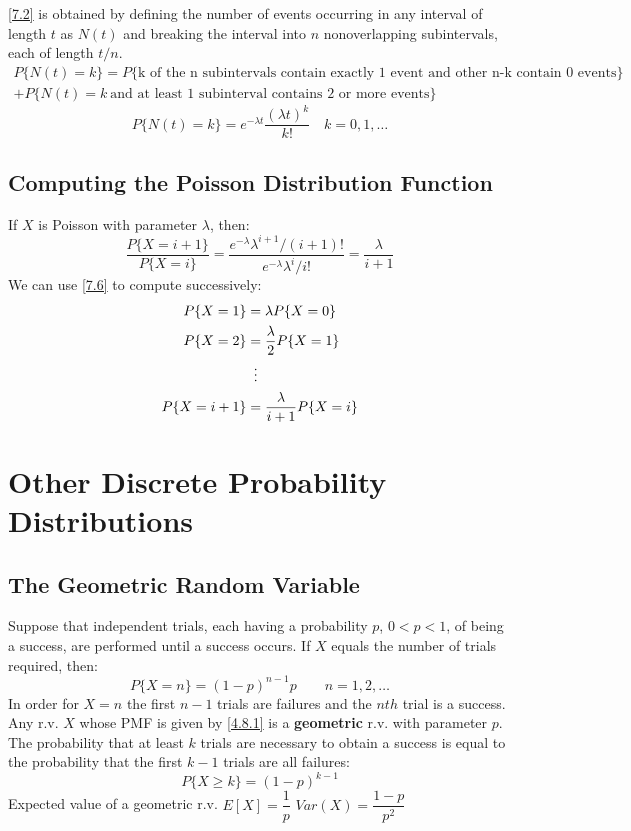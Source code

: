 \documentclass[openany]{book}
\numberwithin{equation}{section}
\begin{document}
\begin{flushleft}
 \eqref{7.2} is obtained by defining the number of events occurring in any interval of length $t$ as $N(t)$ and breaking the interval into $n$ nonoverlapping subintervals, each of length $t/n$.
\begin{multline}
\label{7.2}
P\{N(t)=k\}=P\{\text{k of the n subintervals contain exactly 1 event and other n-k contain 0 events}\}\\ + P\{N(t)=k \ \text{and at least 1 subinterval contains 2 or more events}\}
\end{multline}
\[P\{N(t)=k\}=e^{-\lambda t}\frac{(\lambda t)^k}{k!} \quad k=0,1,\dots \tag{4.7.5} \label{7.5}
\]
\subsection{Computing the Poisson Distribution Function}
If $X$ is Poisson with parameter $\lambda$, then:
\[\frac{P\{X=i+1\}}{P\{X=i\}}=\frac{e^{-\lambda}\lambda^{i+1}/(i+1)!}{e^{-\lambda}\lambda^{i}/i!}=\frac{\lambda}{i+1}\tag{4.7.6} \label{7.6}
\]
We can use \eqref{7.6} to compute successively:
\begin{align*}
P\{X=1\}&=\lambda P\{X=0\}\\
P\{X=2\}&=\frac{\lambda}{2}P\{X=1\}\\
&\vdotswithin{=}\\
P\{X=i+1\} &=\frac{\lambda}{i+1}P\{X=i\}
\end{align*}

\section{Other Discrete Probability Distributions}
\subsection{The Geometric Random Variable}
Suppose that independent trials, each having a probability $p$, $0<p<1$, of being a success, are performed until a success occurs. If $X$ equals the number of trials required, then:
\begin{equation}
\label{4.8.1}
P\{X=n\}=(1-p)^{n-1}p \qquad n=1,2,\dots
\end{equation}
In order for $X=n$ the first $n-1$ trials are failures and the $nth$ trial is a success. \medbreak
Any r.v. $X$ whose PMF is given by \eqref{4.8.1} is a \textbf{geometric} r.v. with parameter $p$. \medbreak
The probability that at least $k$ trials are necessary to obtain a success is equal to the probability that the first $k-1$ trials are all failures:
\[P\{X\geq k\}=(1-p)^{k-1}
\]
Expected value of a geometric r.v.
$E[X]=\dfrac{1}{p}$ \medbreak
$Var(X)=\dfrac{1-p}{p^2}$

\end{flushleft}
\end{document}
